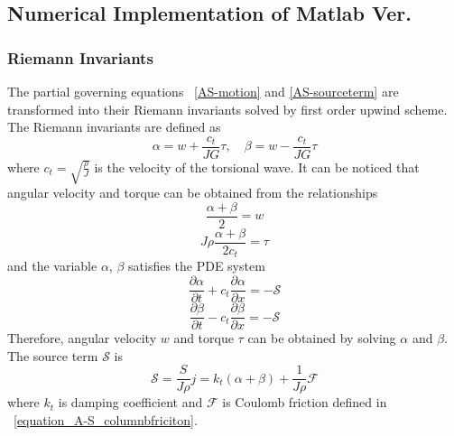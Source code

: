 \subsection{Numerical Implementation of Matlab Ver.}
\subsubsection{Riemann Invariants}
The partial governing equations \equationname~\ref{AS-motion} and \ref{AS-sourceterm} are transformed into their Riemann invariants solved by first order upwind scheme. The Riemann invariants are defined as
\begin{equation}\label{AS-Riemann}
  \alpha = w + \frac{c_t}{JG}\tau, \quad \beta=w-\frac{c_t}{JG}\tau
\end{equation}
where $c_t = \sqrt{\frac{\rho}{J}}$ is the velocity of the torsional wave. It can be noticed that angular velocity and torque can be obtained from the relationships
\begin{equation}\label{equation_Riemann_relation1}
  \frac{\alpha + \beta}{2} = w
\end{equation}
\begin{equation}\label{equation_Riemann_relation2}
  J \rho \frac{\alpha + \beta}{2c_t} = \tau
\end{equation}
and the variable $\alpha$, $\beta$ satisfies the PDE system
\begin{equation}\label{AS-Riemann_alpha}
  \frac{\partial \alpha}{\partial t} + c_t\frac{\partial \alpha}{\partial x} = -\mathcal{S}
\end{equation}
\begin{equation}\label{AS-Riemann_beta}
  \frac{\partial \beta}{\partial t} - c_t\frac{\partial \beta}{\partial x} = -\mathcal{S}
\end{equation}
Therefore, angular velocity $w$ and torque $\tau$ can be obtained by solving $\alpha$ and $\beta$.
The source term $\mathcal{S}$ is
\begin{equation}\label{AS-source}
  \mathcal{S} = \frac{S}{J \rho} j= k_t(\alpha + \beta) + \frac{1}{J \rho} \mathcal{F}
\end{equation}
where $k_t$ is damping coefficient and $\mathcal{F}$ is Coulomb friction defined in \equationname~\ref{equation_A-S_columnbfriciton}.
